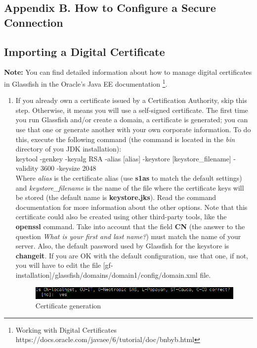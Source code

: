 \documentclass[a4paper]{article}
\begin{document}
\begin{appendices}
			\newpage
			\appendix
			\section{Appendix B. How to Configure a Secure Connection} \label{app:AppendixB}
				\subsection{Importing a Digital Certificate}
				\textbf{Note:} You can find detailed information about how to manage digital certificates in Glassfish in the Oracle's Java EE documentation \footnote{Working with Digital Certificates https://docs.oracle.com/javaee/6/tutorial/doc/bnbyb.html}. \\
				
				\begin{enumerate}
					\item If you already own a certificate issued by a Certification Authority, skip this step. Otherwise, it means you will use a self-signed certificate. The first time you run Glassfish and/or create a domain, a certificate is generated; you can use that one or generate another with your own corporate information. To do this, execute the following command (the command is located in the \textit{bin} directory of you JDK installation):\\
					
					\small keytool -genkey -keyalg RSA -alias [alias] -keystore [keystore\_filename] -validity 3600 -keysize 2048\\
					
					Where \textit{alias} is the certificate alias (use \textbf{s1as} to match the default settings) and \textit{keystore\_filename} is the name of the file where the certificate keys will be stored (the default name is \textbf{keystore.jks}). Read the command documentation for more information about the other options. Note that this certificate could also be created using other third-party tools, like the \textbf{openssl} command. Take into account that the field \textbf{CN} (the answer to the question \textit{What is your first and last name?}) must match the name of your server. Also, the default password used by Glassfish for the keystore is \textbf{changeit}. If you are OK with the default configuration, use that one, if not, you will have to edit the file [gf-installation]/glassfish/domains/domain1/config/domain.xml file.
					\begin{figure}[h!]
						\centering
						\includegraphics[width=0.7\linewidth]{img/certificate_generation.png} 	
						\caption{Certificate generation}
						\label{fig:certificate_generation}
					\end{figure}
					

\end{enumerate}
\end{appendices}
\end{document}
